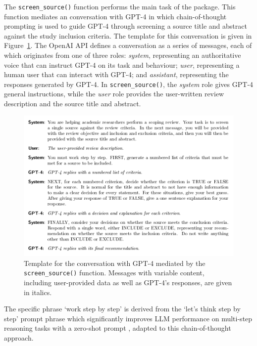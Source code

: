 \documentclass[10pt,a4paper,twocolumn]{article}
\begin{document}
The \texttt{screen\_source()} function performs the main task of the package. This function mediates an conversation with GPT-4 in which chain-of-thought prompting \cite{Wei.2022} is used to guide GPT-4 through screening a source title and abstract against the study inclusion criteria. The template for this conversation is given in Figure~\ref{fig:conversation_template}. The OpenAI API defines a conversation as a series of messages, each of which originates from one of three roles: \textit{system}, representing an authoritative voice that can instruct GPT-4 on its task and behaviour; \textit{user}, representing a human user that can interact with GPT-4; and \textit{assistant}, representing the responses generated by GPT-4. In \texttt{screen\_source()}, the \textit{system} role gives GPT-4 general instructions, while the \textit{user} role provides the user-written review description and the source title and abstract.

\begin{figure}
\centering
  \includegraphics[width=\textwidth]{./fig_1.pdf}
  \caption{Template for the conversation with GPT-4 mediated by the \texttt{screen\_source()} function. Messages with variable content, including user-provided data as well as GPT-4's responses, are given in italics.}
  \label{fig:conversation_template}
\end{figure}

The specific phrase `work step by step' is derived from the `let's think step by step' prompt phrase which significantly improves LLM performance on multi-step reasoning tasks with a zero-shot prompt \cite{Kojima.2022}, adapted to this chain-of-thought approach.
\end{document}
